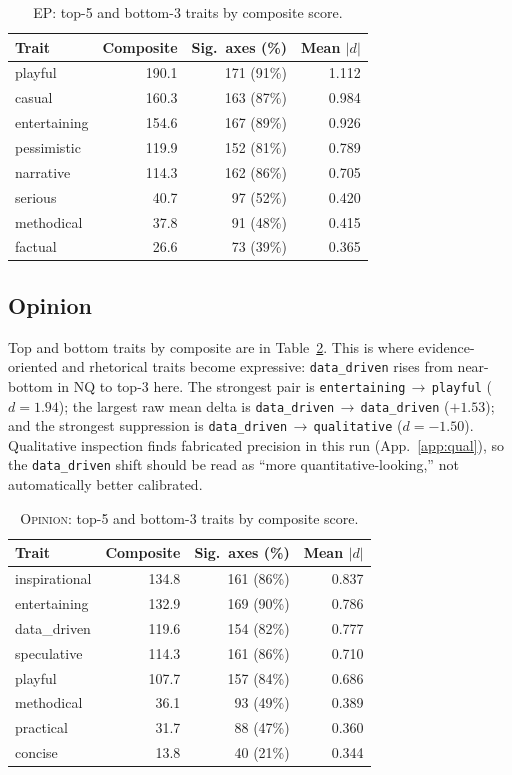 \documentclass{article}
\newcommand{\ax}[1]{\texttt{#1}}   %
\newcommand{\too}{$\rightarrow$}
\begin{document}
\begin{table}[htbp]
\centering
\begin{tabular}{lrrr}
\toprule
Trait & Composite & Sig.\ axes (\%) & Mean $|d|$ \\
\midrule
playful      & 190.1 & 171 (91\%) & 1.112 \\
casual       & 160.3 & 163 (87\%) & 0.984 \\
entertaining & 154.6 & 167 (89\%) & 0.926 \\
pessimistic  & 119.9 & 152 (81\%) & 0.789 \\
narrative    & 114.3 & 162 (86\%) & 0.705 \\
\midrule
serious      & 40.7  & 97 (52\%)  & 0.420 \\
methodical   & 37.8  & 91 (48\%)  & 0.415 \\
factual      & 26.6  & 73 (39\%)  & 0.365 \\
\bottomrule
\end{tabular}
\caption{\textsc{EP}: top-5 and bottom-3 traits by composite score.}
\label{tab:ep_traits}
\end{table}

\subsection{Opinion}
Top and bottom traits by composite are in Table~\ref{tab:opinion_traits}. This is where evidence-oriented and rhetorical traits become expressive: \ax{data\_driven} rises from near-bottom in \textsc{NQ} to top-3 here. The strongest pair is \ax{entertaining}\,\too\,\ax{playful} ($d=1.94$); the largest raw mean delta is \ax{data\_driven}\,\too\,\ax{data\_driven} ($+1.53$); and the strongest suppression is \ax{data\_driven}\,\too\,\ax{qualitative} ($d=-1.50$). Qualitative inspection finds fabricated precision in this run (App.~\ref{app:qual}), so the \ax{data\_driven} shift should be read as ``more quantitative-looking,'' not automatically better calibrated.

\begin{table}[htbp]
\centering
\begin{tabular}{lrrr}
\toprule
Trait & Composite & Sig.\ axes (\%) & Mean $|d|$ \\
\midrule
inspirational & 134.8 & 161 (86\%) & 0.837 \\
entertaining  & 132.9 & 169 (90\%) & 0.786 \\
data\_driven   & 119.6 & 154 (82\%) & 0.777 \\
speculative   & 114.3 & 161 (86\%) & 0.710 \\
playful       & 107.7 & 157 (84\%) & 0.686 \\
\midrule
methodical    & 36.1  & 93 (49\%)  & 0.389 \\
practical     & 31.7  & 88 (47\%)  & 0.360 \\
concise       & 13.8  & 40 (21\%)  & 0.344 \\
\bottomrule
\end{tabular}
\caption{\textsc{Opinion}: top-5 and bottom-3 traits by composite score.}
\label{tab:opinion_traits}
\end{table}
\end{document}

